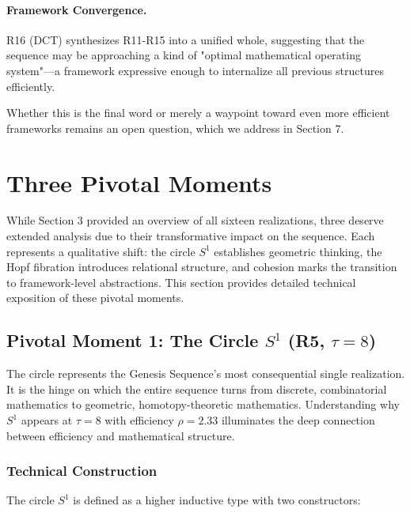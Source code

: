 \documentclass[11pt]{article}
\theoremstyle{definition}
\begin{document}
\paragraph{Framework Convergence.}
R16 (DCT) synthesizes R11-R15 into a unified whole, suggesting that the sequence may be approaching a kind of "optimal mathematical operating system"—a framework expressive enough to internalize all previous structures efficiently.

Whether this is the final word or merely a waypoint toward even more efficient frameworks remains an open question, which we address in Section 7.
\section{Three Pivotal Moments}
\label{sec:pivotal}

While Section 3 provided an overview of all sixteen realizations, three deserve extended analysis due to their transformative impact on the sequence. Each represents a qualitative shift: the circle $S^1$ establishes geometric thinking, the Hopf fibration introduces relational structure, and cohesion marks the transition to framework-level abstractions. This section provides detailed technical exposition of these pivotal moments.

\subsection{Pivotal Moment 1: The Circle $S^1$ (R5, $\tau=8$)}

The circle represents the Genesis Sequence's most consequential single realization. It is the hinge on which the entire sequence turns from discrete, combinatorial mathematics to geometric, homotopy-theoretic mathematics. Understanding why $S^1$ appears at $\tau=8$ with efficiency $\rho=2.33$ illuminates the deep connection between efficiency and mathematical structure.

\subsubsection{Technical Construction}

The circle $S^1$ is defined as a higher inductive type with two constructors:
\end{document}
